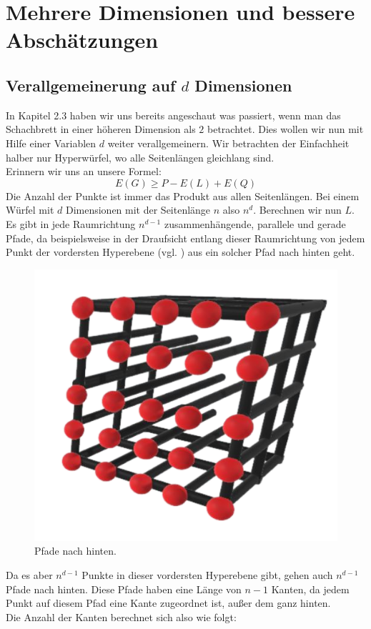 \documentclass[11pt,a4paper]{article}
\numberwithin{equation}{section}
\numberwithin{table}{section}
\numberwithin{figure}{section}
\begin{document}
\section{Mehrere Dimensionen und bessere Abschätzungen}
\subsection{Verallgemeinerung auf \texorpdfstring{$d$}{d} Dimensionen}
In Kapitel 2.3 haben wir uns bereits angeschaut was passiert, wenn man das Schachbrett in einer höheren Dimension als $2$ betrachtet. Dies wollen wir nun mit Hilfe einer Variablen $d$ weiter verallgemeinern. Wir betrachten der Einfachheit halber nur Hyperwürfel, wo alle Seitenlängen gleichlang sind.\\
Erinnern wir uns an unsere Formel:
$$E(G)\geq P-E(L)+E(Q)$$
Die Anzahl der Punkte ist immer das Produkt aus allen Seitenlängen. Bei einem Würfel mit $d$ Dimensionen mit der Seitenlänge $n$ also $n^{d}$.
Berechnen wir nun $L$. Es gibt in jede Raumrichtung $n^{d-1}$ zusammenhängende, parallele und gerade Pfade, da beispielsweise in der Draufsicht entlang dieser Raumrichtung von jedem Punkt der vordersten Hyperebene (vgl. \cite{hyper}) aus ein solcher Pfad nach hinten geht. 
\begin{center}
\begin{figure}[H]\label{Dimension D}
\begin{center}\includegraphics[scale=0.2]{13.png}
\caption{Pfade nach hinten.}\end{center}
\end{figure}
\end{center}
Da es aber $n^{d-1}$ Punkte in dieser vordersten Hyperebene gibt, gehen auch $n^{d-1}$ Pfade nach hinten. Diese Pfade haben eine Länge von $n-1$ Kanten, da jedem Punkt auf diesem Pfad eine Kante zugeordnet ist, außer dem ganz hinten.\\
Die Anzahl der Kanten berechnet sich also wie folgt:
\end{document}
